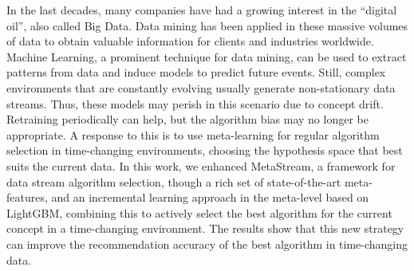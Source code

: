 In the last decades, many companies have had a growing interest in the ``digital oil'', also called Big Data. Data mining has been applied in these massive volumes of data to obtain valuable information for clients and industries worldwide. Machine Learning, a prominent technique for data mining, can be used to extract patterns from data and induce models to predict future events. Still, complex environments that are constantly evolving usually generate non-stationary data streams. Thus, these models may perish in this scenario due to concept drift. Retraining periodically can help, but the algorithm bias may no longer be appropriate. A response to this is to use meta-learning for regular algorithm selection in time-changing environments, choosing the hypothesis space that best suits the current data. In this work, we enhanced MetaStream, a framework for data stream algorithm selection, though a rich set of state-of-the-art meta-features, and an incremental learning approach in the meta-level based on LightGBM, combining this to actively select the best algorithm for the current concept in a time-changing environment. The results show that this new strategy can improve the recommendation accuracy of the best algorithm in time-changing data.